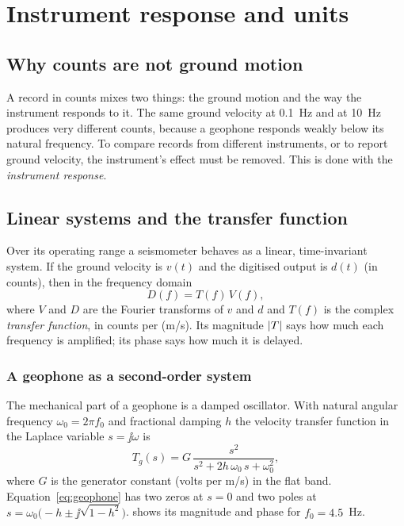 \chapter{Instrument response and units}\label{ch:response}

\section{Why counts are not ground motion}
A record in counts mixes two things: the ground motion and the way the instrument responds to it. The same ground
velocity at 0.1~Hz and at 10~Hz produces very different counts, because a geophone responds weakly below its natural
frequency. To compare records from different instruments, or to report ground velocity, the instrument's effect must
be removed. This is done with the \emph{instrument response}.

\section{Linear systems and the transfer function}
Over its operating range a seismometer behaves as a linear, time-invariant system. If the ground velocity is
$v(t)$ and the digitised output is $d(t)$ (in counts), then in the frequency domain
\begin{equation}
  D(f) = T(f)\,V(f),
\end{equation}
where $V$ and $D$ are the Fourier transforms of $v$ and $d$ and $T(f)$ is the complex \emph{transfer function}, in
counts per (m/s). Its magnitude $\left|T\right|$ says how much each frequency is amplified; its phase says how much it is
delayed.

\subsection{A geophone as a second-order system}
The mechanical part of a geophone is a damped oscillator. With natural angular frequency
$\omega_0 = 2\pi f_0$ and fractional damping $h$ the velocity transfer function in the Laplace variable
$s=\jj\omega$ is
\begin{equation}\label{eq:geophone}
  T_g(s) = G\,\frac{s^{2}}{s^{2} + 2h\,\omega_0\,s + \omega_0^{2}},
\end{equation}
where $G$ is the generator constant (volts per m/s) in the flat band. Equation~\eqref{eq:geophone} has two zeros at
$s=0$ and two poles at $s=\omega_0\bigl(-h \pm \jj\sqrt{1-h^2}\bigr)$.  shows its magnitude and
phase for $f_0 = 4.5$~Hz.

